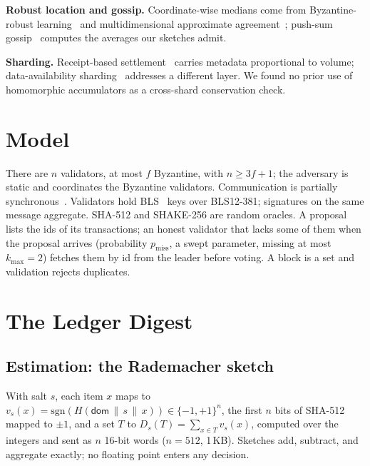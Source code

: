 \documentclass[journal]{IEEEtran}
\begin{document}
\textbf{Robust location and gossip.} Coordinate-wise medians come from
Byzantine-robust learning~\cite{blanchard2017krum,yin2018robust} and
multidimensional approximate agreement~\cite{mendes2013approx}; push-sum
gossip~\cite{kempe2003gossip} computes the averages our sketches admit.

\textbf{Sharding.} Receipt-based settlement~\cite{nightshade} carries
metadata proportional to volume; data-availability
sharding~\cite{danksharding} addresses a different layer. We found no
prior use of homomorphic accumulators as a cross-shard conservation
check.

\section{Model}
\label{sec:model}

There are $n$ validators, at most $f$ Byzantine, with $n \ge 3f + 1$;
the adversary is static and coordinates the Byzantine validators.
Communication is partially synchronous~\cite{dwork1988partialsync}.
Validators hold BLS~\cite{boneh2004bls} keys over BLS12-381; signatures
on the same message aggregate. SHA-512 and SHAKE-256 are random oracles.
A proposal lists the ids of its transactions; an honest validator that
lacks some of them when the proposal arrives (probability
$p_{\mathrm{miss}}$, a swept parameter, missing at most $k_{\max} = 2$)
fetches them by id from the leader before voting. A block is a set and
validation rejects duplicates.

\section{The Ledger Digest}
\label{sec:primitive}

\subsection{Estimation: the Rademacher sketch}

With salt $s$, each item $x$ maps to
$v_{s}(x) = \mathrm{sgn}(H(\textsf{dom} \,\|\, s \,\|\, x)) \in
\{-1,+1\}^{n}$, the first $n$ bits of SHA-512 mapped to $\pm 1$, and a
set $T$ to $D_{s}(T) = \sum_{x \in T} v_{s}(x)$, computed over the
integers and sent as $n$ 16-bit words ($n = 512$, 1\,KB). Sketches add,
subtract, and aggregate exactly; no floating point enters any decision.
\end{document}
